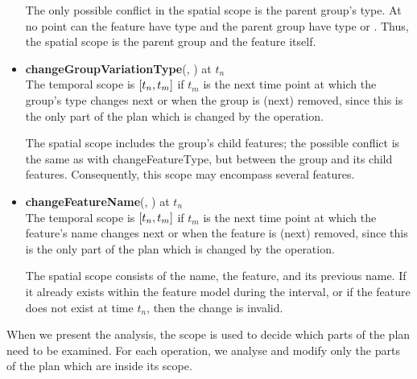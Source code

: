 \begin{itemize}
    The only possible conflict in the spatial scope is the parent group's type. At no point can the feature have type \mandatory{} and the parent group have type \xortype{} or \ortype{}. Thus, the spatial scope is the parent group and the feature itself.\\
  \item \textbf{changeGroupVariationType}(, ) at $t_n$\\
    The temporal scope is $\interval{t_n}{t_m}$ if $t_m$ is the next time point at which the group's type changes next or when the group is (next) removed, since this is the only part of the plan which is changed by the operation.

    The spatial scope includes the group's child features; the possible conflict is the same as with changeFeatureType, but between the group and its child features. Consequently, this scope may encompass several features.\\
  \item \textbf{changeFeatureName}(, ) at $t_n$\\
  The temporal scope is $\interval{t_n}{t_m}$ if $t_m$ is the next time point at which the feature's name changes next or when the feature is (next) removed, since this is the only part of the plan which is changed by the operation.

    The spatial scope consists of the name, the feature, and its previous name. If it already exists within the feature model during the interval, or if the feature does not exist at time $t_n$, then the change is invalid. 
\end{itemize}

When we present the analysis, the scope is used to decide which parts of the plan need to be examined. For each operation, we analyse and modify only the parts of the plan which are inside its scope.

